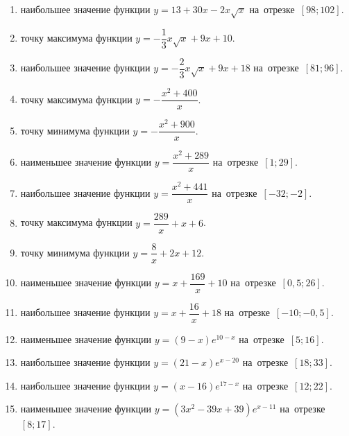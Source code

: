 \documentclass[a4paper,10pt]{article}
\begin{document}
\begin{enumerate}
\item {} наибольшее значение функции $y=13+30x -2x\sqrt{x}$ на~отрезке~$\left[98;102\right]$.

\item {} точку максимума функции $y=-\dfrac{1}{3}x\sqrt{x} +9x+10$.

\item {} наибольшее значение функции $y=-\dfrac{2}{3}x\sqrt{x} +9x+18$ на~отрезке~$\left[81;96\right]$.

\item {} точку максимума функции $y=-\dfrac{x^2 +400}{x}$.

\item {} точку минимума функции $y=-\dfrac{x^2 +900}{x}$.

\item {} наименьшее значение функции $y=\dfrac{x^2 +289}{x}$ на~отрезке~$\left[1;29\right]$.

\item {} наибольшее значение функции $y=\dfrac{x^2 +441}{x}$ на~отрезке~$\left[-32;-2\right]$.

\item {} точку максимума функции $y=\dfrac{289}{x} +x+6$.

\item {} точку минимума функции $y=\dfrac{8}{x} +2x+12$.

\item {} наименьшее значение функции $y=x+\dfrac{169}{x} +10$ на~отрезке~$\left[0,5;26\right]$.

\item {} наибольшее значение функции $y=x+\dfrac{16}{x} +18$ на~отрезке~$\left[-10;-0,5\right]$.

\item {} наименьшее значение функции $y=\left(9-x\right)e^{10-x}$ на~отрезке~$\left[5;16\right]$.

\item {} наибольшее значение функции $y=\left(21-x\right)e^{x-20}$ на~отрезке~$\left[18;33\right]$.

\item {} наибольшее значение функции $y=\left(x-16\right)e^{17-x}$ на~отрезке~$\left[12;22\right]$.

\item {} наименьшее значение функции $y=\left(3x^2 -39x +39\right)e^{x -11}$ на~отрезке~$\left[8;17\right]$.


\end{enumerate}
\end{document}
